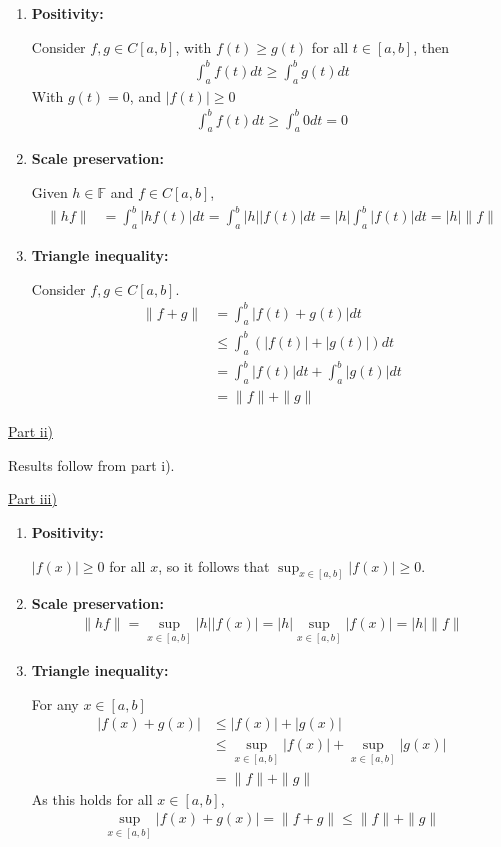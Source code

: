 \documentclass[letterpaper,12pt]{article}
\begin{document}
\begin{enumerate}
  \item \textbf{Positivity:}
  
        Consider $f, g \in C[a, b]$, with $f(t) \geq g(t)$ for all $t \in [a, b]$, then
        \begin{align*}
          \int_a^b f(t)dt \geq \int_a^b g(t)dt 
        \end{align*}
        With $g(t) = 0$, and $|f(t)| \geq 0$
        \begin{align*}
          \int_a^b f(t)dt \geq \int_a^b 0 dt = 0
        \end{align*}
  \item \textbf{Scale preservation:}
  
        Given $h \in \mathbb F$ and $f \in C[a, b]$,
        \begin{align*}
          \| hf \| &= \int_a^b |h f(t)| dt = \int_a^b |h||f(t)| dt =
          |h| \int_a^b |f(t)| dt = |h| \|f\|
        \end{align*}
  \item \textbf{Triangle inequality:}
        
        Consider $f, g \in C[a, b]$.
        \begin{align*}
          \| f + g \| &= \int_a^b |f(t) + g(t)| dt \\
          &\leq \int_a^b (|f(t)| + |g(t)|) dt \\
          &= \int_a^b |f(t)|dt + \int_a^b |g(t)|dt \\
          &= \|f\| + \|g\| 
        \end{align*}
\end{enumerate}

\underline{Part ii)}

Results follow from part i).

\underline{Part iii)}

\begin{enumerate}
  \item \textbf{Positivity:}
  
        $|f(x)| \geq 0$ for all $x$, so it follows that $\sup_{x \in [a, b]} |f(x)| \geq 0$.
  \item \textbf{Scale preservation:}
        \begin{align*}
          \|hf\| = \sup_{x \in [a, b]} |h||f(x)| = |h| \sup_{x \in [a, b]} |f(x)| = |h|\|f\|
        \end{align*}
  \item \textbf{Triangle inequality:}
  
        For any $x \in [a, b]$
        \begin{align*}
          |f(x) + g(x)| &\leq |f(x)| + |g(x)| \\
                        &\leq \sup_{x \in [a, b]} |f(x)| + \sup_{x \in [a, b]} |g(x)| \\
                        &= \|f\| + \|g\|
        \end{align*}
        As this holds for all $x \in [a, b]$,
        \begin{align*}
          \sup_{x \in [a, b]} |f(x) + g(x)| = \|f + g \| \leq \|f\| + \|g\|
        \end{align*}
\end{enumerate}
\end{document}
